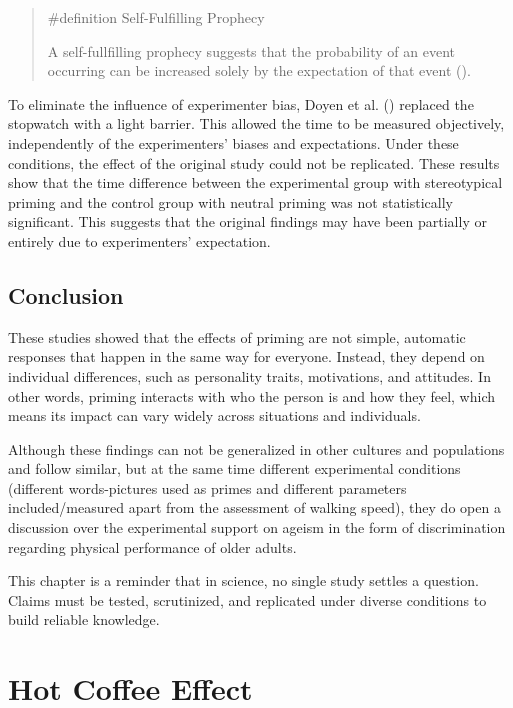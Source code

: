 \documentclass[
  letterpaper,
]{book}
\begin{document}
\begin{quote}
\label{def-selffulfillingprophecy}{\#definition}
Self-Fulfilling Prophecy

A self-fullfilling prophecy suggests that the probability of an event
occurring can be increased solely by the expectation of that event
().
\end{quote}

To eliminate the influence of experimenter bias, Doyen et al.
() replaced the stopwatch with
a light barrier. This allowed the time to be measured objectively,
independently of the experimenters' biases and expectations. Under these
conditions, the effect of the original study could not be replicated.
These results show that the time difference between the experimental
group with stereotypical priming and the control group with neutral
priming was not statistically significant. This suggests that the
original findings may have been partially or entirely due to
experimenters' expectation.

\section{Conclusion}\label{conclusion-24}

These studies showed that the effects of priming are not simple,
automatic responses that happen in the same way for everyone. Instead,
they depend on individual differences, such as personality traits,
motivations, and attitudes. In other words, priming interacts with who
the person is and how they feel, which means its impact can vary widely
across situations and individuals.

Although these findings can not be generalized in other cultures and
populations and follow similar, but at the same time different
experimental conditions (different words-pictures used as primes and
different parameters included/measured apart from the assessment of
walking speed), they do open a discussion over the experimental support
on ageism in the form of discrimination regarding physical performance
of older adults.

This chapter is a reminder that in science, no single study settles a
question. Claims must be tested, scrutinized, and replicated under
diverse conditions to build reliable knowledge.


\chapter{\texorpdfstring{{Hot Coffee
Effect}}{Hot Coffee Effect}}\label{hot-coffee-effect}
\end{document}
